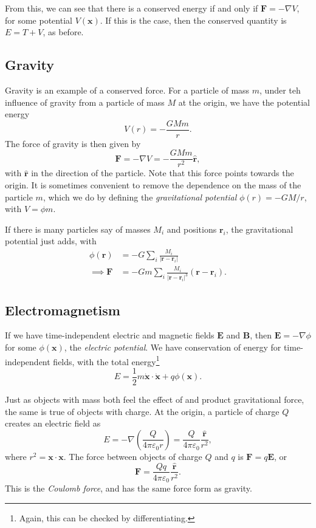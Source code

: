\documentclass{scrartcl}
\newcommand{\vv}[1]{\boldsymbol{\mathbf{#1}}}
\theoremstyle{definition}
\newcommand{\hh}[1]{\hat{\vv{#1}}}
\begin{document}
From this, we can see that there is a conserved energy if and only if $\vv F = - \nabla V$, for some potential $V(\vv x)$. If this is the case, then the conserved quantity is $E = T + V$, as before.

\subsection*{Gravity}

Gravity is an example of a conserved force. For a particle of mass $m$, under teh influence of gravity from a particle of mass $M$ at the origin, we have the potential energy
$$
V(r) = -\frac{GMm}{r}.
$$
The force of gravity is then given by
$$
\vv F = - \nabla V = -\frac{G Mm}{r^2} \hh r,
$$
with $\hh r$ in the direction of the particle. Note that this force points towards the origin.
It is sometimes convenient to remove the dependence on the mass of the particle $m$, which we do by defining the \emph{gravitational potential} $\phi(r) = -GM/r$, with $V = \phi m$.

If there is many particles say of masses $M_i$ and positions $\vv r_i$, the gravitational potential just adds, with 
\begin{align*}
	\phi(\vv r) &= -G \sum_i \frac{M_i}{|\vv r - \vv r_i|} \\
\implies \vv F &= -Gm \sum_i \frac{M_i}{|\vv r - \vv r_i|^3} (\vv r - \vv r_i).
\end{align*}

\subsection*{Electromagnetism}

If we have time-independent electric and magnetic fields $\vv E$ and $\vv B$, then $\vv E = - \nabla \phi$ for some $\phi(\vv x)$, the \emph{electric potential}. We have conservation of energy for time-independent fields, with the total energy\footnote{Again, this can be checked by differentiating.}
$$
E = \frac{1}{2}m \dot{\vv x} \cdot \dot{\vv x} + q \phi(\vv x). 
$$

Just as objects with mass both feel the effect of and product gravitational force, the same is true of objects with charge. At the origin, a particle of charge $Q$ creates an electric field as
$$
E = - \nabla \left(\frac{Q}{4 \pi \varepsilon_0 r}\right) = \frac{Q}{4 \pi \varepsilon_0} \frac{\hh r}{r^2},
$$
where $r^2 = \vv x \cdot \vv x$. The force between objects of charge $Q$ and $q$ is $\vv F = q \vv E$, or
$$
\vv F = \frac{Qq}{4 \pi \varepsilon_0} \frac{\hh r}{r^2}.
$$
This is the \emph{Coulomb force}, and has the same force form as gravity.
\end{document}
